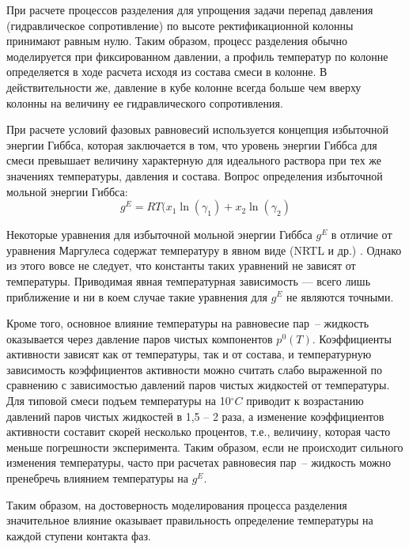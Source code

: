 При расчете процессов разделения для упрощения задачи перепад давления (гидравлическое сопротивление) по высоте ректификационной колонны принимают равным нулю. Таким образом, процесс разделения обычно моделируется при фиксированном давлении, а профиль температур по колонне определяется в ходе расчета исходя из состава смеси в колонне. В действительности же, давление в кубе колонне всегда больше чем вверху колонны на величину ее гидравлического сопротивления. 

При расчете условий фазовых равновесий используется концепция избыточной энергии Гиббса, которая заключается в том, что уровень энергии Гиббса для смеси превышает величину характерную для идеального раствора при тех же значениях температуры, давления и состава. Вопрос определения избыточной мольной энергии Гиббса:
\begin{equation}
	g^E=RT(x_1\ln (\gamma_1) +x_2 \ln(\gamma_2)
\end{equation}

Некоторые уравнения для избыточной мольной энергии Гиббса $g^E$ в отличие от уравнения Маргулеса содержат температуру в явном виде (NRTL и др.) \cite{rid1982,yelles1989}. Однако из этого вовсе не следует, что константы таких уравнений не зависят от температуры. Приводимая явная температурная зависимость --- всего лишь приближение и ни в коем случае такие уравнения для $g^E$ не являются точными.

Кроме того, основное влияние температуры на равновесие пар~-- жидкость оказывается через давление паров чистых компонентов $p^0(T)$. Коэффициенты активности зависят как от температуры, так и от состава, и температурную зависимость коэффициентов активности можно считать слабо выраженной по сравнению с зависимостью давлений паров чистых жидкостей от температуры. Для типовой смеси подъем температуры на 10$\mathrm{^\circ}C$ приводит к возрастанию давлений паров чистых жидкостей в 1,5 -- 2 раза, а изменение коэффициентов активности составит скорей несколько процентов, т.е., величину, которая часто меньше погрешности эксперимента. Таким образом, если не происходит сильного изменения температуры, часто при расчетах равновесия пар~-- жидкость можно пренебречь влиянием температуры на $g^E$.
 
Таким образом, на достоверность моделирования процесса разделения значительное влияние оказывает правильность определение температуры на каждой ступени контакта фаз.

